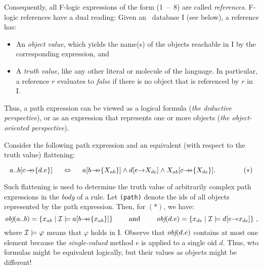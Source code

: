 \documentclass[11pt]{report}
\begin{document}
Consequently, all F-logic expressions of the form (1~--~8) are called
\emph{references}. F-logic references have a dual reading: Given an
\fl\ database \db I (see below), a reference has:
\begin{itemize}
\item An \emph{object value}, which yields the name(s) of the objects
  reachable in \db I by the corresponding expression, and 
\item A \emph{truth value}, like any other literal or molecule of the
  language. In particular, a reference $r$ evaluates to \emph{false} if
  there is no object that is referenced by $r$ in \db I.
\end{itemize}
Thus, a path expression can be viewed as a logical formula (\emph{the
  deductive perspective}), or as an expression that represents one or more
objects (\emph{the object-oriented perspective}).

Consider the following path expression and an equivalent (with respect to
the truth value) flattening:

\begin{displaymath}
a..b[c\mvd\{d.e\}] \quad\ \Leftrightarrow \quad\  a[b\mvd\{X_{ab}\}]
\land d[e\fd X_{de}] \land X_{ab}[c\mvd\{X_{de}\}]. \hspace{4em} (*)
\end{displaymath}


\noindent
Such flattening is used to determine the truth value of arbitrarily complex
path expressions in the \emph{body} of a rule.  Let {\tt \obj(path)} denote
the ids of all objects represented by the path expression. Then, for $(*)$,
we have:
\begin{displaymath}
\textit{obj}(a..b) = \{x_{ab} \mid \mathcal{I} \models a[b{\rightarrow\!\!\!\!\rightarrow}\{x_{ab}\}]\}
\qquad\textrm{ and }\qquad \textit{obj}(d.e) = \{x_{de} \mid \mathcal{I} \models d[e{\rightarrow} 
x_{de}]\} ~,
\end{displaymath}
%
where $\mathcal{I} \models \varphi$ means that $\varphi$ holds in \db I.
Observe that $\textit{obj}(d.e)$ contains at most one element because the
\emph{single-valued} method $e$ is applied to a single oid $d$. Thus, wto
formulas might be equivalent logically, but their values as objects might
be different!
\end{document}
